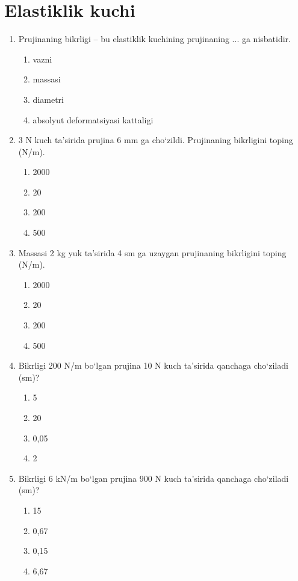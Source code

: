 

\section{Elastiklik kuchi}

\begin{enumerate}

\item Prujinaning bikrligi – bu elastiklik kuchining prujinaning ... ga nisbatidir.
\begin{enumerate}[label=\Alph*)]
\item vazni
\item massasi
\item diametri
\item absolyut deformatsiyasi kattaligi
\end{enumerate}

\item 3 N kuch ta’sirida prujina 6 mm ga cho‘zildi. Prujinaning bikrligini toping (N/m).
\begin{enumerate}[label=\Alph*)]
\item 2000
\item 20
\item 200
\item 500
\end{enumerate}

\item Massasi 2 kg yuk ta’sirida 4 sm ga uzaygan prujinaning bikrligini toping (N/m).
\begin{enumerate}[label=\Alph*)]
\item 2000
\item 20
\item 200
\item 500
\end{enumerate}

\item Bikrligi 200 N/m bo‘lgan prujina 10 N kuch ta’sirida qanchaga cho‘ziladi (sm)?
\begin{enumerate}[label=\Alph*)]
\item 5
\item 20
\item 0,05
\item 2
\end{enumerate}

\item Bikrligi 6 kN/m bo‘lgan prujina 900 N kuch ta’sirida qanchaga cho‘ziladi (sm)?
\begin{enumerate}[label=\Alph*)]
\item 15
\item 0,67
\item 0,15
\item 6,67
\end{enumerate}


\end{enumerate}
